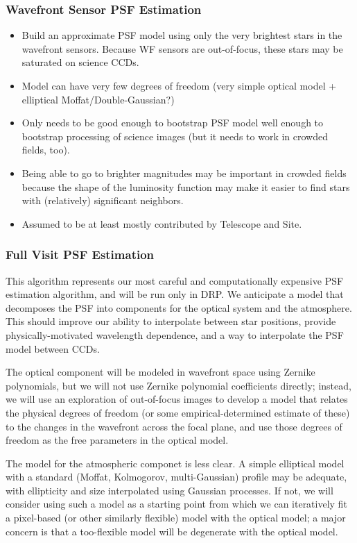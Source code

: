\subsubsection{Wavefront Sensor PSF Estimation}
\label{sec:acWavefrontSensorPSF}
\begin{itemize}
\item Build an approximate PSF model using only the very brightest stars in the wavefront sensors.  Because WF sensors are out-of-focus, these stars may be saturated on science CCDs.
\item Model can have very few degrees of freedom (very simple optical model + elliptical Moffat/Double-Gaussian?)
\item Only needs to be good enough to bootstrap PSF model well enough to bootstrap processing of science images (but it needs to work in crowded fields, too).
\item Being able to go to brighter magnitudes may be important in crowded fields because the shape of the luminosity function may make it easier to find stars with (relatively) significant neighbors.
\item Assumed to be at least mostly contributed by Telescope and Site.
\end{itemize}

\subsubsection{Full Visit PSF Estimation}
\label{sec:acFullVisitPSF}

This algorithm represents our most careful and computationally expensive PSF estimation algorithm, and will be run only in DRP.  We anticipate a model that decomposes the PSF into components for the optical system and the atmosphere.  This should improve our ability to interpolate between star positions, provide physically-motivated wavelength dependence, and a way to interpolate the PSF model between CCDs.

The optical component will be modeled in wavefront space using Zernike polynomials, but we will not use Zernike polynomial coefficients directly; instead, we will use an exploration of out-of-focus images to develop a model that relates the physical degrees of freedom (or some empirical-determined estimate of these) to the changes in the wavefront across the focal plane, and use those degrees of freedom as the free parameters in the optical model.

The model for the atmospheric componet is less clear.  A simple elliptical model with a standard (Moffat, Kolmogorov, multi-Gaussian) profile may be adequate, with ellipticity and size interpolated using Gaussian processes.  If not, we will consider using such a model as a starting point from which we can iteratively fit a pixel-based (or other similarly flexible) model with the optical model; a major concern is that a too-flexible model will be degenerate with the optical model.

